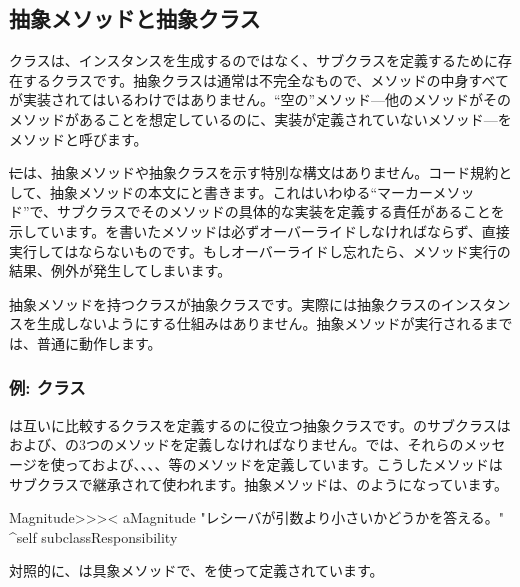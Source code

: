 \documentclass[a4paper,10pt,twoside]{book}
\begin{document}
\subsection{抽象メソッドと抽象クラス}

クラスは、インスタンスを生成するのではなく、サブクラスを定義するために存在するクラスです。抽象クラスは通常は不完全なもので、メソッドの中身すべてが実装されてはいるわけではありません。``空の''メソッド---他のメソッドがそのメソッドがあることを想定しているのに、実装が定義されていないメソッド---をメソッドと呼びます。

\st には、抽象メソッドや抽象クラスを示す特別な構文はありません。コード規約として、抽象メソッドの本文に\mbox{}と書きます。これはいわゆる``マーカーメソッド''で、サブクラスでそのメソッドの具体的な実装を定義する責任があることを示しています。を書いたメソッドは必ずオーバーライドしなければならず、直接実行してはならないものです。もしオーバーライドし忘れたら、メソッド実行の結果、例外が発生してしまいます。

抽象メソッドを持つクラスが抽象クラスです。実際には抽象クラスのインスタンスを生成しないようにする仕組みはありません。抽象メソッドが実行されるまでは、普通に動作します。

\subsubsection{例: クラス}
は互いに比較するクラスを定義するのに役立つ抽象クラスです。のサブクラスは\ct{<}および\ct{=}、の3つのメソッドを定義しなければなりません。では、それらのメッセージを使って\ct{>}および\ct{>=}、\ct{<=}、、、等のメソッドを定義しています。こうしたメソッドはサブクラスで継承されて使われます。抽象メソッドは、のようになっています。

\begin{method}[MagnitudeLessThan]{}
Magnitude>>>< aMagnitude 
	"レシーバが引数より小さいかどうかを答える。"
	^self subclassResponsibility
\end{method}

\noindent
対照的に、は具象メソッドで、\ct{<}を使って定義されています。
\end{document}
